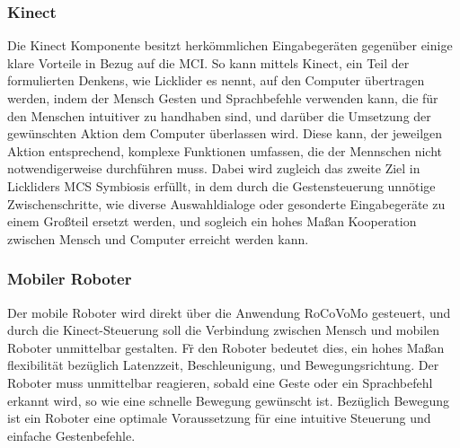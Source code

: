 \subsubsection{Kinect}
Die Kinect Komponente besitzt herk\"ommlichen Eingabeger\"aten gegen\"uber einige klare Vorteile in Bezug auf die \gls{MCI}. So kann mittels Kinect, ein Teil der formulierten Denkens, wie Licklider es nennt, auf den Computer \"ubertragen werden, indem der Mensch Gesten und Sprachbefehle verwenden kann, die f\"ur den Menschen intuitiver zu handhaben sind, und dar\"uber die Umsetzung der gew\"unschten Aktion dem Computer \"uberlassen wird. Diese kann, der jeweilgen Aktion entsprechend, komplexe Funktionen umfassen, die der Mennschen nicht notwendigerweise durchf\"uhren muss. Dabei wird zugleich das zweite Ziel in Lickliders \gls{MCS} Symbiosis erf\"ullt, in dem durch die Gestensteuerung unn\"otige Zwischenschritte, wie diverse Auswahldialoge oder gesonderte Eingabeger\"ate zu einem Gro\ss teil ersetzt werden, und sogleich ein hohes Ma\ss an Kooperation zwischen Mensch und Computer erreicht werden kann. 

\subsubsection{Mobiler Roboter}
Der mobile Roboter wird direkt \"uber die Anwendung RoCoVoMo gesteuert, und durch die Kinect-Steuerung soll die Verbindung zwischen Mensch und mobilen Roboter unmittelbar gestalten. F\"r den Roboter bedeutet dies, ein hohes Ma\ss an flexibilit\"at bez\"uglich Latenzzeit, Beschleunigung, und Bewegungsrichtung. Der Roboter muss unmittelbar reagieren, sobald eine Geste oder ein Sprachbefehl erkannt wird, so wie eine schnelle Bewegung gew\"unscht ist. Bez\"uglich Bewegung ist ein 
 Roboter eine optimale Voraussetzung f\"ur eine intuitive Steuerung und einfache Gestenbefehle.

